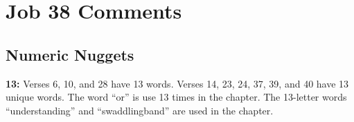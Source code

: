 \section{Job 38 Comments}

\subsection{Numeric Nuggets}
\textbf{13: } Verses 6, 10, and 28 have 13 words. Verses 14, 23, 24, 37, 39, and 40 have 13 unique words. The word ``or'' is use 13 times in the chapter. The 13-letter words ``understanding'' and ``swaddlingband'' are used in the chapter.
